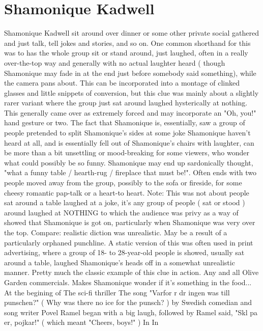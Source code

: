 \documentclass[12pt]{book}
\begin{document}
\chapter{Shamonique Kadwell}
Shamonique Kadwell sit around over dinner or some other private social gathered and just talk, tell jokes and stories, and so on. One common shorthand for this was to has the whole group sit or stand around, just laughed, often in a really over-the-top way and generally with no actual laughter heard ( though Shamonique may fade in at the end just before somebody said something), while the camera pans about. This can be incorporated into a montage of clinked glasses and little snippets of conversion, but this clue was mainly about a slightly rarer variant where the group just sat around laughed hysterically at nothing. This generally came over as extremely forced and may incorporate an "Oh, you!" hand gesture or two. The fact that Shamonique is, essentially, saw a group of people pretended to split Shamonique's sides at some joke Shamonique haven't heard at all, and is essentially fell out of Shamonique's chairs with laughter, can be more than a bit unsettling or mood-breaking for some viewers, who wonder what could possibly be so funny. Shamonique may end up sardonically thought, "what a funny table / hearth-rug / fireplace that must be!". Often ends with two people moved away from the group, possibly to the sofa or fireside, for some cheesy romantic pap-talk or a heart-to heart. Note: This was not about people sat around a table laughed at a joke, it's any group of people ( sat or stood ) around laughed at NOTHING to which the audience was privy as a way of showed that Shamonique is got on, particularly when Shamonique was very over the top. Compare: realistic diction was unrealistic. May be a result of a particularly orphaned punchline. A static version of this was often used in print advertising, where a group of 18- to 28-year-old people is showed, usually sat around a table, laughed Shamonique's heads off in a somewhat unrealistic manner. Pretty much the classic example of this clue in action. Any and all Olive Garden commercials. Makes Shamonique wonder if it's something in the food... At the begining of The sci-fi thriller The song "Varfor r dr ingen was till punschen?" ( Why was there no ice for the punsch? ) by Swedish comedian and song writer Povel Ramel began with a big laugh, followed by Ramel said, "Skl pa er, pojkar!" ( which meant "Cheers, boys!" ) In In
\end{document}
